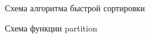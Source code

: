 \documentclass[12pt]{report}
\begin{document}
\newpage
\begin{figure}[h]
\caption{Схема алгоритма быстрой сортировки}
\label{ris:imageSQ}
\end{figure}

\newpage
\begin{figure}[h]
\caption{Схема функции partition}
\label{ris:imageSP}
\end{figure}
\end{document}
